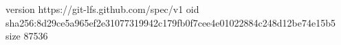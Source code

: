 version https://git-lfs.github.com/spec/v1
oid sha256:8d29ce5a965ef2e31077319942c179fb0f7cee4e01022884c248d12be74e15b5
size 87536
